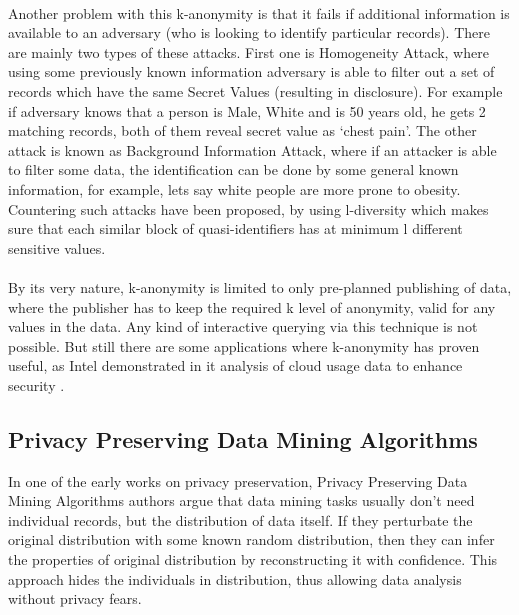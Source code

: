 \documentclass[12pt]{report}
\theoremstyle{named}
\begin{document}
\paragraph{}
Another problem with this k-anonymity is that it fails if additional information is available to an adversary (who is looking to identify particular records). There are mainly two types of these attacks. First one is Homogeneity Attack, where using some previously known information adversary is able to filter out a set of records which have the same Secret Values (resulting in disclosure). For example if adversary knows that a person is Male, White and is 50 years old, he gets 2 matching records, both of them reveal secret value as `chest pain'. The other attack is known as Background Information Attack, where if an attacker is able to filter some data, the identification can be done by some general known information, for example, lets say white people are more prone to obesity. Countering such attacks have been proposed, by using l-diversity \cite{machanavajjhala2006diversity} which makes sure that each similar block of quasi-identifiers has at minimum l different sensitive values.

\paragraph{}
By its very nature, k-anonymity is limited to only pre-planned publishing of data, where the publisher has to keep the required k level of anonymity, valid for any values in the data. Any kind of interactive querying via this technique is not possible. But still there are some applications where k-anonymity has proven useful, as Intel demonstrated in it analysis of cloud usage data to enhance security \cite{sedayao2012enhancing}. 




\subsection{Privacy Preserving Data Mining Algorithms}
In one of the early works on privacy preservation, Privacy Preserving Data Mining Algorithms \cite{agrawal2001design} authors argue that data mining tasks usually don’t need individual records, but the distribution of data itself. If they perturbate the original distribution with some known random distribution, then they can infer the properties of original distribution by reconstructing it with confidence. This approach hides the individuals in distribution, thus allowing data analysis without privacy fears.
\end{document}
